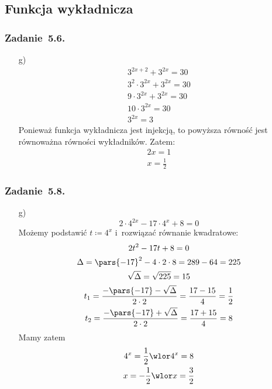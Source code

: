 \subsection*{Funkcja wykładnicza}
\subsubsection*{Zadanie~5.6.}
\begin{itemize}
    \item[g)]
        \begin{gather*}
            3^{2x + 2} + 3^{2x} = 30\\
            3^2 \cdot 3^{2x} + 3^{2x} = 30\\
            9 \cdot 3^{2x} + 3^{2x} = 30\\
            10 \cdot 3^{2x} = 30\\
            3^{2x} = 3
        \end{gather*}
        Ponieważ funkcja wykładnicza jest injekcją, to powyższa równość jest równoważna równości wykładników. Zatem:
        \begin{gather*}
            2x = 1\\
            x = \frac{1}{2}
        \end{gather*}
\end{itemize}
\subsubsection*{Zadanie~5.8.}
\begin{itemize}
    \item[g)]
        \begin{equation*}
            2 \cdot 4^{2x} - 17 \cdot 4^x + 8 = 0
        \end{equation*}
        Możemy podstawić \(t \coloneqq 4^x\) i~rozwiązać równanie kwadratowe:
        \begin{gather*}
            2t^2 - 17t + 8 = 0\\
            \Delta
                = \pars{-17}^2 - 4 \cdot 2 \cdot 8
                = 289 - 64
                = 225\\
            \sqrt{\Delta} = \sqrt{225} = 15\\
            t_1
                = \frac{-\pars{-17} - \sqrt{\Delta}}{2 \cdot 2}
                = \frac{17 - 15}{4}
                = \frac{1}{2}\\
            t_2
                = \frac{-\pars{-17} + \sqrt{\Delta}}{2 \cdot 2}
                = \frac{17 + 15}{4}
                = 8
        \end{gather*}
        Mamy zatem
        \begin{gather*}
            4^x = \frac{1}{2} \wlor 4^x = 8\\
            x = -\frac{1}{2} \wlor x = \frac{3}{2}
        \end{gather*}
\end{itemize}
